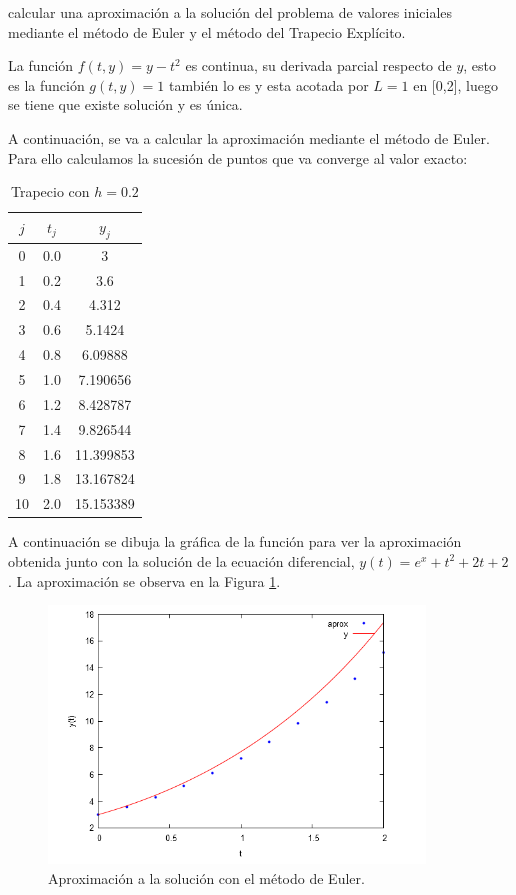 \documentclass{article}
\theoremstyle{theorem-style}  %
\theoremstyle{definition-style}
\theoremstyle{example-style}
\begin{document}
calcular una aproximación a la solución del problema de valores iniciales mediante el método de Euler y el método del Trapecio Explícito.

La función $f(t,y) = y - t^2$ es continua, su derivada parcial respecto de $y$, esto es la función $g(t,y) = 1$ también lo es y esta acotada por $L=1$ en [0,2], luego se tiene que existe solución y es única.

A continuación, se va a calcular la aproximación mediante el método de Euler. Para ello calculamos la sucesión de puntos que va converge al valor exacto:

	\begin{table}[H]
		\centering
		\begin{tabular}{|| c | c | c ||}
			\hline
			\hline $j$ &  $t_j $ & $y_j$\\
			\hline 0 & 0.0 & 3 \\
			\hline 1 & 0.2 & 3.6  \\
			\hline 2 & 0.4 & 4.312 \\
			\hline 3 & 0.6 & 5.1424 \\
			\hline 4 & 0.8 & 6.09888 \\
			\hline 5 & 1.0 & 7.190656 \\
			\hline 6 & 1.2 & 8.428787 \\
			\hline 7 & 1.4 & 9.826544 \\
			\hline 8 & 1.6 & 11.399853 \\
			\hline 9 & 1.8 & 13.167824 \\
			\hline 10 & 2.0 & 15.153389 \\
		\end{tabular}
		\caption{Trapecio con $h=0.2$}
		\label{table:trapecio-ejtp1.1}
	\end{table}

A continuación se dibuja la gráfica de la función para ver la aproximación obtenida junto con la solución de la ecuación diferencial, $y(t)= e^x + t^2 + 2t + 2$. La aproximación se observa en la Figura \ref{fig:aprox1}.

	\begin{figure}[h]
		\centering
		\includegraphics[width=10cm]{./Images/ejtp1-1.png}
		\caption{Aproximación a la solución con el método de Euler.}
		\label{fig:aprox1}
	\end{figure}
\end{document}
